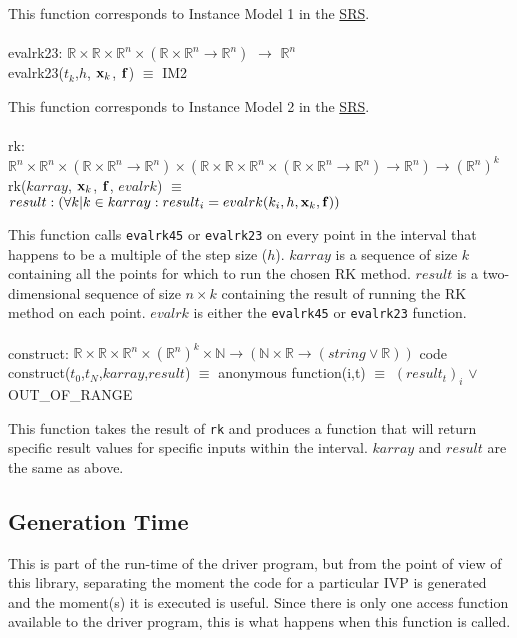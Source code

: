 \documentclass[12pt, titlepage]{article}
\begin{document}
This function corresponds to Instance Model 1 in the 
\href{../SRS/CA.pdf}{SRS}.\\
\\
evalrk23: $\mathbb{R} \times \mathbb{R} \times \mathbb{R}^n \times (\mathbb{R} 
\times \mathbb{R}^n \rightarrow \mathbb{R}^n)$ $\rightarrow$ $\mathbb{R}^n$\\
evalrk23($t_k$,$h$, ${\bf x}_k$, ${\bf f}$) $\equiv$ IM2

This function corresponds to Instance Model 2 in the 
\href{../SRS/CA.pdf}{SRS}.\\
\\
rk: $\mathbb{R}^n \times \mathbb{R}^n \times 
(\mathbb{R} \times \mathbb{R}^n \rightarrow \mathbb{R}^n) \times
(\mathbb{R} \times \mathbb{R} \times \mathbb{R}^n \times (\mathbb{R} 
\times \mathbb{R}^n \rightarrow \mathbb{R}^n) \rightarrow \mathbb{R}^n) 
\rightarrow (\mathbb{R}^n)^k$\\
rk($karray$, ${\bf x}_k$, ${\bf f}$, $evalrk$) $\equiv$ $result : (\forall k | 
k 
\in karray : result_i = evalrk (k_i,h, {\bf x}_k, {\bf f}))$

This function calls \lstinline[language=ML]|evalrk45| or 
\lstinline[language=ML]|evalrk23| on every point in the interval that happens 
to be a multiple of the step size ($h$). $karray$ is a sequence of size $k$ 
containing all the points for 
which to run the chosen RK method. $result$ is a two-dimensional 
sequence of size $n \times k$ containing the result of running the RK method on 
each point. $evalrk$ is either the \lstinline[language=ML]|evalrk45| or 
\lstinline[language=ML]|evalrk23| function.\\
\\
construct: $\mathbb{R} \times \mathbb{R} \times \mathbb{R}^n \times 
(\mathbb{R}^n)^k \times \mathbb{N} \rightarrow (\mathbb{N} \times \mathbb{R} 
\rightarrow (string \lor \mathbb{R}))$ code\\
construct($t_0$,$t_N$,$karray$,$result$) $\equiv$ anonymous function(i,t) 
$\equiv$ $(result_t)_i$ $\lor$ OUT\_OF\_RANGE

This function takes the result of \lstinline[language=ML]|rk| and produces a 
function that will return specific result values for specific inputs  within the 
interval. $karray$ and $result$ are the same as above.

\subsection{Generation Time}\label{ssec:generation-time}
This is part of the run-time of the driver program, but from the point of view 
of this library, separating the moment the code for a particular IVP is 
generated and the moment(s) it is executed is useful. Since there is only one 
access function available to the driver program, this is what happens when this 
function is called.
\end{document}
